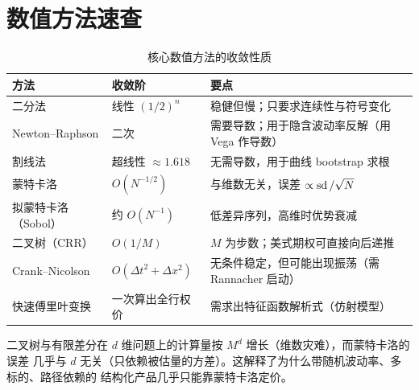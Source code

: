 \section{数值方法速查}

\begin{table}[htbp]
\centering
\caption{核心数值方法的收敛性质}\label{tab:numerical}
\tablefont
\begin{tabularx}{\textwidth}{@{}L{3.4cm}L{2.6cm}Y@{}}
\toprule
\textbf{方法} & \textbf{收敛阶} & \textbf{要点} \\
\midrule
二分法 & 线性 $(1/2)^n$ & 稳健但慢；只要求连续性与符号变化 \\
Newton--Raphson & 二次 & 需要导数；用于隐含波动率反解（用 Vega 作导数） \\
割线法 & 超线性 $\approx 1.618$ & 无需导数，用于曲线 bootstrap 求根 \\
蒙特卡洛 & $O(N^{-1/2})$ & 与维数无关，误差 $\propto\operatorname{sd}/\sqrt{N}$ \\
拟蒙特卡洛（Sobol） & 约 $O(N^{-1})$ & 低差异序列，高维时优势衰减 \\
二叉树（CRR） & $O(1/M)$ & $M$ 为步数；美式期权可直接向后递推 \\
Crank--Nicolson & $O(\Delta t^2+\Delta x^2)$ & 无条件稳定，但可能出现振荡（需 Rannacher 启动） \\
快速傅里叶变换 & 一次算出全行权价 & 需求出特征函数解析式（仿射模型） \\
\bottomrule
\end{tabularx}
\end{table}

\begin{intuitionbox}[为什么蒙特卡洛在高维下胜出]
二叉树与有限差分在 $d$ 维问题上的计算量按 $M^d$ 增长（维数灾难），而蒙特卡洛的误差
几乎与 $d$ 无关（只依赖被估量的方差）。这解释了为什么带随机波动率、多标的、路径依赖的
结构化产品几乎只能靠蒙特卡洛定价。
\end{intuitionbox}
